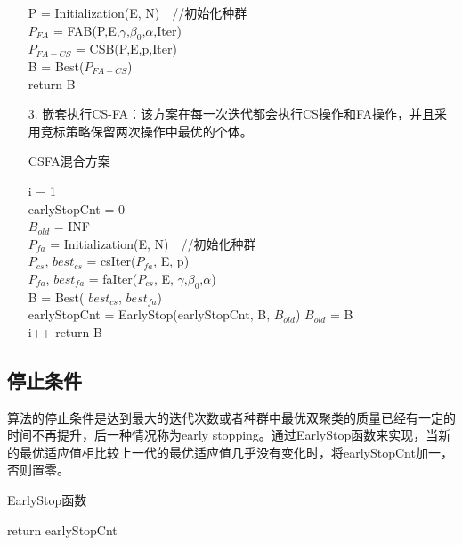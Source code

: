 \begin{enumerate}
\begin{algorithm}[htbp]
        P = Initialization(E, N)　//初始化种群 \\
        $P_{FA}$ = FAB(P,E,$\gamma$,$\beta_0$,$\alpha$,Iter) \\
        $P_{FA-CS}$ = CSB(P,E,p,Iter) \\
        B = Best($P_{FA-CS}$) \\
        return B \\
        \end{algorithm}
       \item[3.] 嵌套执行CS-FA：该方案在每一次迭代都会执行CS操作和FA操作，并且采用竞标策略保留两次操作中最优的个体。
        \begin{algorithm}[htbp]
        \caption{CSFA混合方案}\label{alg:csfa}
        i = 1 \\
        earlyStopCnt = 0 \\
        $B_{old}$ = INF \\
        $P_{fa}$ = Initialization(E, N)　//初始化种群 \\
        {
            $P_{cs}$, $best_{cs}$ = csIter($P_{fa}$, E, p) \\
            $P_{fa}$, $best_{fa}$ = faIter($P_{cs}$, E, $\gamma$,$\beta_0$,$\alpha$) \\
            B = Best( $best_{cs}$, $best_{fa}$) \\
            earlyStopCnt = EarlyStop(earlyStopCnt, B, $B_{old}$)
            $B_{old}$ = B \\
            i++
        }
        return B
        \end{algorithm}
    \end{enumerate}
    \subsection{停止条件}
    算法的停止条件是达到最大的迭代次数或者种群中最优双聚类的质量已经有一定的时间不再提升，后一种情况称为early stopping。通过EarlyStop函数来实现，当新的最优适应值相比较上一代的最优适应值几乎没有变化时，将earlyStopCnt加一，否则置零。
    \begin{algorithm}[htbp]
    \caption{EarlyStop函数}
    \SetAlgoLined
        return earlyStopCnt 
    \end{algorithm}

